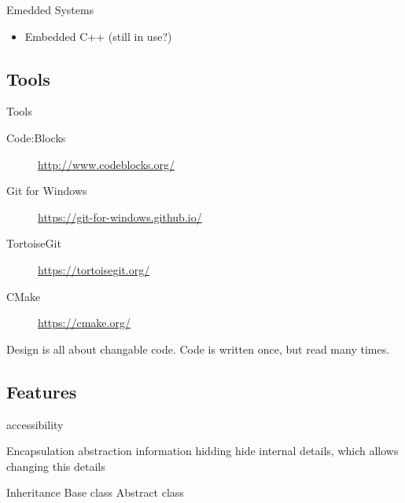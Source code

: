 \documentclass{beamer}
\begin{document}
\begin{frame}{Emedded Systems}
\begin{itemize}
  \item Embedded C++ (still in use?)
\end{itemize}
\end{frame}

\subsection{Tools}
\begin{frame}{Tools}
\begin{description}
  \item[Code:Blocks] \url{http://www.codeblocks.org/}
  \item[Git for Windows] \url{https://git-for-windows.github.io/}
  \item[TortoiseGit] \url{https://tortoisegit.org/}
  \item[CMake] \url{https://cmake.org/}  
\end{description}

\begin{note}
  
\end{note}
 
\end{frame}


\begin{frame}
Design is all about changable code.
Code is written once, but read many times.
\end{frame}

\subsection{Features}

\begin{frame}
accessibility
\end{frame}

\begin{frame}{Encapsulation}
abstraction
information hidding
hide internal details, which allows changing this details
\end{frame}

\begin{frame}{Inheritance}
Base class
Abstract class
\end{frame}
\end{document}
